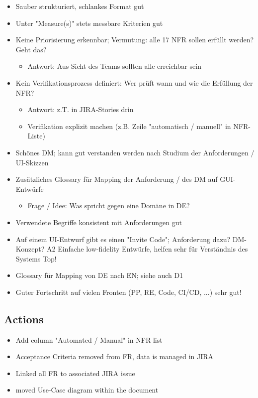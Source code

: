 \begin{itemize}
\begin{itemize}
    \end{itemize}
    \item Sauber strukturiert, schlankes Format \textrightarrow gut
    \item Unter "Measure(s)" stets messbare Kriterien \textrightarrow gut
    \item Keine Priorisierung erkennbar; Vermutung: alle 17 NFR sollen erfüllt werden? Geht das?
    \begin{itemize}
        \item Antwort: Aus Sicht des Teams sollten alle erreichbar sein
    \end{itemize}
    \item Kein Verifikationsprozess definiert: Wer prüft wann und wie die Erfüllung der NFR?
    \begin{itemize}
        \item Antwort: z.T. in JIRA-Stories drin
        \item Verifikation explizit machen (z.B. Zeile "automatisch / manuell" in NFR-Liste)
    \end{itemize}
    \item Schönes DM; kann gut verstanden werden nach Studium der Anforderungen / UI-Skizzen
    \item Zusätzliches Glossary für Mapping der Anforderung / des DM auf GUI-Entwürfe
    \begin{itemize}
        \item Frage / Idee: Was spricht gegen eine Domäne in DE?
    \end{itemize}
    \item Verwendete Begriffe konsistent mit Anforderungen \textrightarrow gut
    \item Auf einem UI-Entwurf gibt es einen "Invite Code"; Anforderung dazu? DM-Konzept? A2 Einfache low-fidelity Entwürfe, helfen sehr für Verständnis des Systems \textrightarrow Top!
    \item Glossary für Mapping von DE nach EN; siehe auch D1
    \item Guter Fortschritt auf vielen Fronten (PP, RE, Code, CI/CD, ...) \textrightarrow sehr gut!
\end{itemize}

\subsection{Actions}

\begin{itemize}
    \item Add column "Automated / Manual" in NFR list
    \item Acceptance Criteria removed from FR, data is managed in JIRA
    \item Linked all FR to associated JIRA issue
    \item moved Use-Case diagram within the document
\end{itemize}

